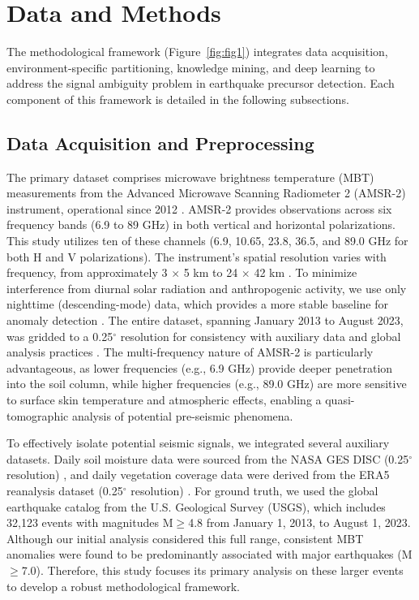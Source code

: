 \documentclass[preprint,review,12pt,authoryear]{elsarticle}
\begin{document}
\section{Data and Methods}\label{sec:data_methods}

The methodological framework (Figure~\ref{fig:fig1}) integrates data acquisition, environment-specific partitioning, knowledge mining, and deep learning to address the signal ambiguity problem in earthquake precursor detection. Each component of this framework is detailed in the following subsections.

\subsection{Data Acquisition and Preprocessing}\label{sec:data_acquisition}

The primary dataset comprises microwave brightness temperature (MBT) measurements from the Advanced Microwave Scanning Radiometer 2 (AMSR-2) instrument, operational since 2012 \citep{kasaharaStatusAMSR22012}. AMSR-2 provides observations across six frequency bands (6.9 to 89 GHz) in both vertical and horizontal polarizations. This study utilizes ten of these channels (6.9, 10.65, 23.8, 36.5, and 89.0 GHz for both H and V polarizations). The instrument's spatial resolution varies with frequency, from approximately 3 $\times$ 5 km to 24 $\times$ 42 km \citep{kachiStatusGCOMW1AMSR22008}. To minimize interference from diurnal solar radiation and anthropogenic activity, we use only nighttime (descending-mode) data, which provides a more stable baseline for anomaly detection \citep{maedaDiscriminationLocalFaint2008}. The entire dataset, spanning January 2013 to August 2023, was gridded to a 0.25$^{\circ}$ resolution for consistency with auxiliary data and global analysis practices \citep{njokuRetrievalLandSurface1999,wuIdentifyingSeismicAnomalies2024}. The multi-frequency nature of AMSR-2 is particularly advantageous, as lower frequencies (e.g., 6.9 GHz) provide deeper penetration into the soil column, while higher frequencies (e.g., 89.0 GHz) are more sensitive to surface skin temperature and atmospheric effects, enabling a quasi-tomographic analysis of potential pre-seismic phenomena.

To effectively isolate potential seismic signals, we integrated several auxiliary datasets. Daily soil moisture data were sourced from the NASA GES DISC (0.25$^{\circ}$ resolution) \citep{fangGlobalLandData2009}, and daily vegetation coverage data were derived from the ERA5 reanalysis dataset (0.25$^{\circ}$ resolution) \citep{hersbachERA5GlobalReanalysis2020,munoz-sabaterERA5landStateoftheartGlobal2021}. For ground truth, we used the global earthquake catalog from the U.S. Geological Survey (USGS), which includes 32,123 events with magnitudes M$\ge$4.8 from January 1, 2013, to August 1, 2023. Although our initial analysis considered this full range, consistent MBT anomalies were found to be predominantly associated with major earthquakes (M$\ge$7.0). Therefore, this study focuses its primary analysis on these larger events to develop a robust methodological framework.
\end{document}
